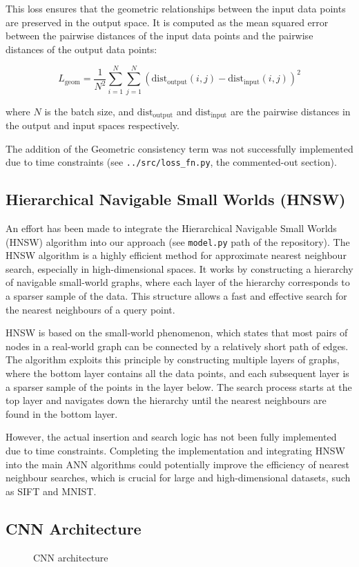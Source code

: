 \documentclass[sigconf, nonacm]{acmart}
\begin{document}
\begin{enumerate}
   This loss ensures that the geometric relationships between the input data points are preserved in the output space. It is computed as the mean squared error between the pairwise distances of the input data points and the pairwise distances of the output data points:

   \[ L_{\text{geom}} = \frac{1}{N^2} \sum_{i=1}^{N} \sum_{j=1}^{N} \left( \text{dist}_{\text{output}}(i, j) - \text{dist}_{\text{input}}(i, j) \right)^2 \]

   where \(N\) is the batch size, and \(\text{dist}_{\text{output}}\) and \(\text{dist}_{\text{input}}\) are the pairwise distances in the output and input spaces respectively.
\end{enumerate}

The addition of the Geometric consistency term was not successfully implemented due to time constraints (see \verb|../src/loss_fn.py|, the commented-out section).

\subsection{Hierarchical Navigable Small Worlds (HNSW)}

An effort has been made to integrate the Hierarchical Navigable Small Worlds (HNSW) algorithm into our approach (see \texttt{model.py} path of the repository). The HNSW algorithm is a highly efficient method for approximate nearest neighbour search, especially in high-dimensional spaces. It works by constructing a hierarchy of navigable small-world graphs, where each layer of the hierarchy corresponds to a sparser sample of the data. This structure allows a fast and effective search for the nearest neighbours of a query point.

HNSW is based on the small-world phenomenon, which states that most pairs of nodes in a real-world graph can be connected by a relatively short path of edges. The algorithm exploits this principle by constructing multiple layers of graphs, where the bottom layer contains all the data points, and each subsequent layer is a sparser sample of the points in the layer below. The search process starts at the top layer and navigates down the hierarchy until the nearest neighbours are found in the bottom layer.

However, the actual insertion and search logic has not been fully implemented due to time constraints. Completing the implementation and integrating HNSW into the main ANN algorithms could potentially improve the efficiency of nearest neighbour searches, which is crucial for large and high-dimensional datasets, such as SIFT and MNIST.

\subsection{CNN Architecture}\label{sec:cnn}
\begin{figure}[!hb]
        \centering
        \resizebox{\columnwidth}{!}{
        } %
        \caption{CNN architecture}
        \label{cnn}
\end{figure}
\end{document}

